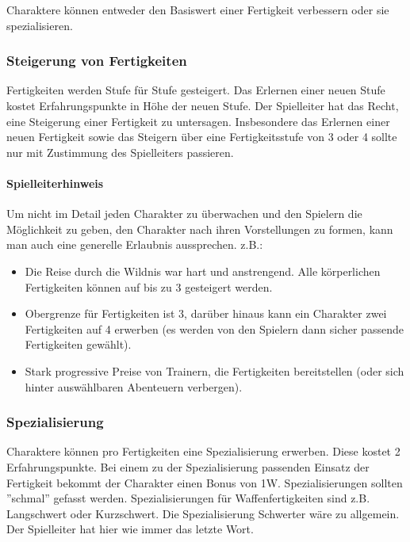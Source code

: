 \documentclass{article}
\begin{document}
Charaktere können entweder den Basiswert einer Fertigkeit verbessern oder sie spezialisieren.

\subsubsection{Steigerung von Fertigkeiten}

Fertigkeiten werden Stufe für Stufe gesteigert. Das Erlernen einer neuen Stufe kostet Erfahrungspunkte in Höhe der
neuen Stufe. Der Spielleiter hat das Recht, eine Steigerung einer Fertigkeit zu untersagen. Insbesondere das Erlernen
einer neuen Fertigkeit sowie das Steigern über eine Fertigkeitsstufe von 3 oder 4 sollte nur mit Zustimmung des
Spielleiters passieren.

\begin{mdframed}[hidealllines=true, backgroundcolor=black!10]
\paragraph{Spielleiterhinweis}

Um nicht im Detail jeden Charakter zu überwachen und den Spielern die Möglichkeit zu geben, den Charakter nach ihren
Vorstellungen zu formen, kann man auch eine generelle Erlaubnis aussprechen. z.B.:

\begin{itemize}
\item Die Reise durch die Wildnis war hart und anstrengend. Alle körperlichen Fertigkeiten können auf bis zu 3 gesteigert werden.
\item Obergrenze für Fertigkeiten ist 3, darüber hinaus kann ein Charakter zwei Fertigkeiten auf 4 erwerben (es werden von den Spielern dann sicher passende Fertigkeiten gewählt).
\item Stark progressive Preise von Trainern, die Fertigkeiten bereitstellen (oder sich hinter auswählbaren Abenteuern verbergen).
\end{itemize}

\end{mdframed}
\subsubsection{Spezialisierung}

Charaktere können pro Fertigkeiten eine Spezialisierung erwerben. Diese kostet 2 Erfahrungspunkte. Bei einem zu der
Spezialisierung passenden Einsatz der Fertigkeit bekommt der Charakter einen Bonus von 1W. Spezialisierungen sollten
''schmal'' gefasst werden. Spezialisierungen für Waffenfertigkeiten sind z.B. Langschwert oder Kurzschwert. Die
Spezialisierung Schwerter wäre zu allgemein. Der Spielleiter hat hier wie immer das letzte Wort.
\end{document}
